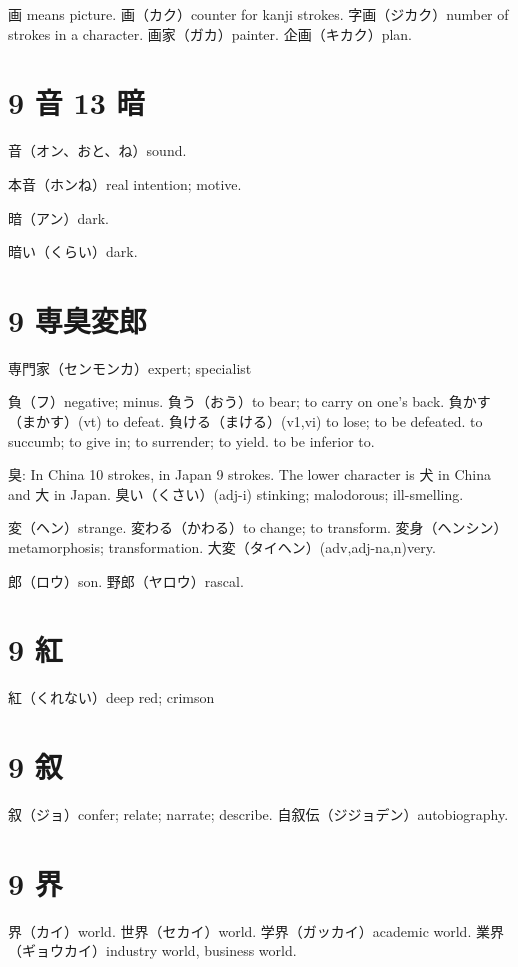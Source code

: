 画 means picture.
画（カク）counter for kanji strokes.
字画（ジカク）number of strokes in a character.
画家（ガカ）painter.
企画（キカク）plan.

\section{9 音 13 暗}

音（オン、おと、ね）sound.

本音（ホンね）real intention; motive.

暗（アン）dark.

暗い（くらい）dark.

\section{9 専臭変郎}

専門家（センモンカ）expert; specialist

負（フ）negative; minus.
負う（おう）to bear; to carry on one's back.
負かす（まかす）(vt) to defeat.
負ける（まける）(v1,vi)
to lose; to be defeated.
to succumb; to give in; to surrender; to yield.
to be inferior to.

臭: In China 10 strokes, in Japan 9 strokes.
The lower character is 犬 in China and 大 in Japan.
臭い（くさい）(adj-i) stinking; malodorous; ill-smelling.

変（ヘン）strange.
変わる（かわる）to change; to transform.
変身（ヘンシン）metamorphosis; transformation.
大変（タイヘン）(adv,adj-na,n)very.

郎（ロウ）son.
野郎（ヤロウ）rascal.

\section{9 紅}

紅（くれない）deep red; crimson

\section{9 叙}

叙（ジョ）confer; relate; narrate; describe.
自叙伝（ジジョデン）autobiography.

\section{9 界}

界（カイ）world.
世界（セカイ）world.
学界（ガッカイ）academic world.
業界（ギョウカイ）industry world, business world.


